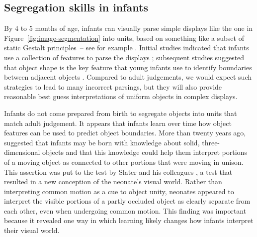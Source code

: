 


\subsection{Segregation skills in infants}

\label{sect:infant-skills}


%
By 4 to 5 months of age, infants can
visually parse simple displays like the one in 
Figure~\ref{fig:image-segmentation}
 into units, based on something like 
a subset of static
Gestalt principles~--
 see for example .
%
%
%
Initial studies indicated that infants use a collection of
features to parse the displays \cite{needham98infants,needham97object,needham98effects}; subsequent studies suggested that object shape is the key
feature that young infants use to identify boundaries between adjacent
objects \cite{needham99role}.
%
%
Compared to adult judgements,
%
we would expect such strategies to lead to many incorrect parsings,
but they will
also provide reasonable best guess interpretations of uniform objects
in complex displays.  



Infants do not come prepared from birth to segregate objects into 
units that match adult judgement.
%
%
It appears that infants learn over time how object
features can be used to predict object boundaries.  More than twenty
years ago,  suggested that infants may be born
with knowledge about solid, three-dimensional objects and that this
knowledge could help them interpret portions of a moving object as
connected to other portions that were moving in unison.  This
assertion was put to the test by Slater and his colleagues 
\cite{slater90newborn}, a test that resulted in a new conception of
the neonate's visual world.  Rather than interpreting common motion as
a cue to object unity, neonates appeared to interpret the visible portions of a
partly occluded object as clearly separate from each other, even when
undergoing common motion.  This finding was important because it
revealed one way in which learning likely changes how infants
interpret their visual world.



